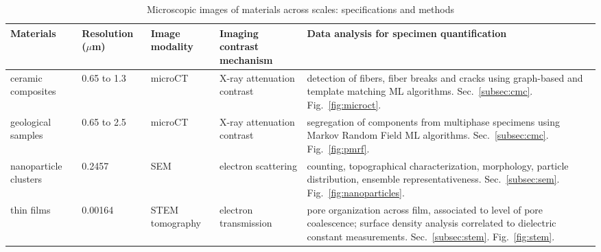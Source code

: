 
\begin{table*}[!]
\centering
\caption{Microscopic images of materials across scales: specifications and methods}
\label{table1}
\begin{tabular}{p{2cm}p{1.6cm}p{1.6cm}p{3cm}p{7.5cm}}
\hline
\rowcolor[HTML]{CCE5FF}
Materials  &  Resolution ($\mu$m)  &  Image \newline modality  &  Imaging contrast \newline mechanism  &  Data analysis for specimen quantification                                       \\
\hline
\rowcolor[HTML]{FFFFFF}
ceramic \newline composites & 0.65 to 1.3                               & microCT                               & X-ray attenuation contrast                    & detection of fibers, fiber breaks and cracks using graph-based and template matching ML algorithms. Sec.~\ref{subsec:cmc}. Fig.~\ref{fig:microct}.
\\
\hline
\rowcolor[HTML]{F6F6F6}
geological samples & 0.65 to 2.5  & microCT                               & X-ray attenuation contrast              & segregation of components from multiphase specimens using Markov Random Field ML algorithms. Sec.~\ref{subsec:cmc}. Fig.~\ref{fig:pmrf}.
\\
\hline
\rowcolor[HTML]{FFFFFF}
nanoparticle clusters & 0.2457 & SEM                               &
electron scattering                    & counting, topographical characterization, morphology, particle distribution, ensemble representativeness. Sec.~\ref{subsec:sem}. Fig.~\ref{fig:nanoparticles}.
\\
\hline
\rowcolor[HTML]{F6F6F6}
thin films   & 0.00164  & STEM \newline tomography                       & electron transmission                & pore organization across film, associated to level of pore coalescence; surface density analysis correlated to dielectric constant measurements. Sec.~\ref{subsec:stem}. Fig.~\ref{fig:stem}.
\\
\hline
\end{tabular}
\end{table*}
